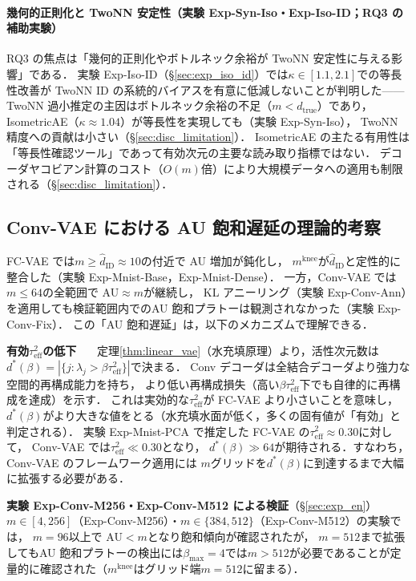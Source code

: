 \documentclass[11pt,a4paper]{jsarticle}
\newcommand{\kap}{\kappa}
\newcommand{\mknee}{m^{\mathrm{knee}}}
\begin{document}
\paragraph{幾何的正則化と TwoNN 安定性（実験 Exp-Syn-Iso・Exp-Iso-ID；RQ3 の補助実験）}
RQ3 の焦点は「幾何的正則化やボトルネック余裕が TwoNN 安定性に与える影響」である．
実験 Exp-Iso-ID（§\ref{sec:exp_iso_id}）では$\kap \in [1.1, 2.1]$での等長性改善が
TwoNN ID の系統的バイアスを有意に低減しないことが判明した——
TwoNN 過小推定の主因はボトルネック余裕の不足（$m < d_\mathrm{true}$）であり，
IsometricAE（$\kap \approx 1.04$）が等長性を実現しても（実験 Exp-Syn-Iso），
TwoNN 精度への貢献は小さい（§\ref{sec:disc_limitation}）．
IsometricAE の主たる有用性は「等長性確認ツール」であって有効次元の主要な読み取り指標ではない．
デコーダヤコビアン計算のコスト（$O(m)$倍）により大規模データへの適用も制限される（§\ref{sec:disc_limitation}）．

\subsection{Conv-VAE における AU 飽和遅延の理論的考察}\label{sec:disc_convvae}

FC-VAE では$m \geq \hat{d}_\mathrm{ID} \approx 10$の付近で AU 増加が鈍化し，
$\mknee$が$\hat{d}_\mathrm{ID}$と定性的に整合した（実験 Exp-Mnist-Base，Exp-Mnist-Dense）．
一方，Conv-VAE では$m \leq 64$の全範囲で AU$\approx m$が継続し，
KL アニーリング（実験 Exp-Conv-Ann）を適用しても検証範囲内でのAU 飽和プラトーは観測されなかった（実験 Exp-Conv-Fix）．
この「AU 飽和遅延」は，以下のメカニズムで理解できる．

\textbf{有効$\tau^2_\mathrm{eff}$の低下}~~~
定理\ref{thm:linear_vae}（水充填原理）より，活性次元数は
$d^*(\beta) = |\{j : \lambda_j > \beta\tau^2_\mathrm{eff}\}|$で決まる．
Conv デコーダは全結合デコーダより強力な空間的再構成能力を持ち，
より低い再構成損失（高い$\beta\tau^2_\mathrm{eff}$下でも自律的に再構成を達成）を示す．
これは実効的な$\tau^2_\mathrm{eff}$が FC-VAE より小さいことを意味し，
$d^*(\beta)$がより大きな値をとる（水充填水面が低く，多くの固有値が「有効」と判定される）．
実験 Exp-Mnist-PCA で推定した FC-VAE の$\tau^2_\mathrm{eff} \approx 0.30$に対して，
Conv-VAE では$\tau^2_\mathrm{eff} \ll 0.30$となり，
$d^*(\beta) \gg 64$が期待される．すなわち，Conv-VAE のフレームワーク適用には
$m$グリッドを$d^*(\beta)$に到達するまで大幅に拡張する必要がある．

\textbf{実験 Exp-Conv-M256・Exp-Conv-M512 による検証}（§\ref{sec:exp_en}）~~~
$m \in [4,256]$（Exp-Conv-M256）・$m \in \{384,512\}$（Exp-Conv-M512）の実験では，
$m = 96$以上で AU$<m$となり飽和傾向が確認されたが，
$m=512$まで拡張してもAU 飽和プラトーの検出には$\beta_{\max}=4$では$m>512$が必要であることが定量的に確認された（$\mknee$はグリッド端$m=512$に留まる）．
\end{document}
